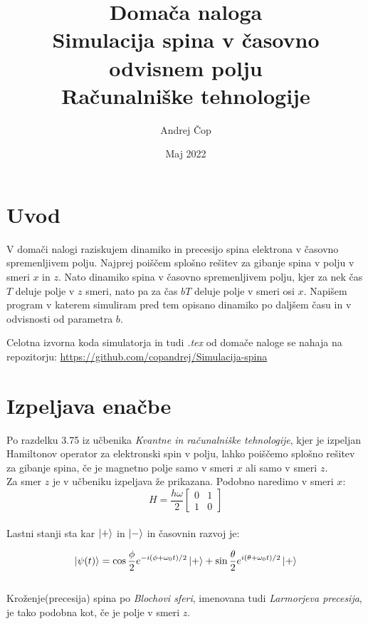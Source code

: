 \documentclass[12pt, a4paper]{article}
\title{  Domača naloga\\\large\textbf{Simulacija spina v časovno odvisnem polju}\\
\large Računalniške tehnologije}
\author{Andrej Čop}
\date{Maj 2022}
\begin{document}
\maketitle
\newpage

\tableofcontents
\newpage

\section{Uvod}
V domači nalogi raziskujem dinamiko in precesijo spina elektrona v časovno spremenljivem polju. Najprej poiščem splošno rešitev za gibanje spina v polju v smeri $x$ in $z$. Nato dinamiko spina v časovno spremenljivem polju, kjer za nek čas $T$ deluje polje v $z$ smeri, nato pa za čas $bT$ deluje polje v smeri osi $x$. Napišem program v katerem simuliram pred tem opisano dinamiko po daljšem času in v odvisnosti od parametra $b$.

Celotna izvorna koda simulatorja in tudi \textit{.tex} od domače naloge se nahaja na repozitorju: \url{https://github.com/copandrej/Simulacija-spina} 
\section{Izpeljava enačbe}
Po razdelku 3.75 iz učbenika \textit{Kvantne in računalniške tehnologije}, kjer je izpeljan Hamiltonov operator za elektronski spin v polju, lahko poiščemo splošno rešitev za gibanje spina, če je magnetno polje samo v smeri $x$ ali samo v smeri $z$.\\
Za smer $z$ je v učbeniku izpeljava že prikazana. Podobno naredimo v smeri $x$:\\
\begin{equation}
H = \frac{h\omega}{2}
\begin{bmatrix}
0 & 1\\
1 & 0
\end{bmatrix}
\end{equation}\\
Lastni stanji sta kar $\ket{+}$ in $\ket{-}$ in časovnin razvoj je:


\begin{equation}
\ket{\psi(t)} = \cos\frac{\phi}{2}e^{-i(\phi+\omega_0 t)/2}\ket{+} + \sin\frac{\theta}{2}e^{i(\theta+\omega_0 t)/2}\ket{+}
\end{equation}\\
Kroženje(precesija) spina po \textit{Blochovi sferi}, imenovana tudi \textit{Larmorjeva precesija}, je tako podobna kot, če je polje v smeri $z$.
\end{document}
